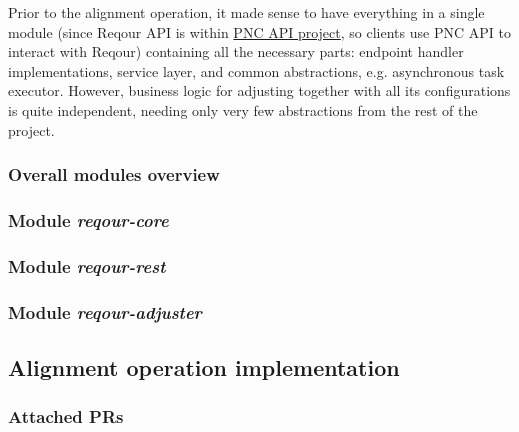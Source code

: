 \documentclass[../main.tex]{subfiles}
\begin{document}
Prior to the alignment operation, it made sense to have everything in a single module (since Reqour API is within \href{https://github.com/project-ncl/pnc-api}{PNC API project}, so clients use PNC API to interact with Reqour) containing all the necessary parts: endpoint handler implementations, service layer, and common abstractions, e.g. asynchronous task executor. However, business logic for adjusting together with all its configurations is quite independent, needing only very few abstractions from the rest of the project.

\subsubsection*{Overall modules overview}


\subsubsection*{Module \textit{reqour-core}}


\subsubsection*{Module \textit{reqour-rest}}


\subsubsection*{Module \textit{reqour-adjuster}}


\subsection*{Alignment operation implementation}


\subsubsection*{Attached PRs}

\end{document}
